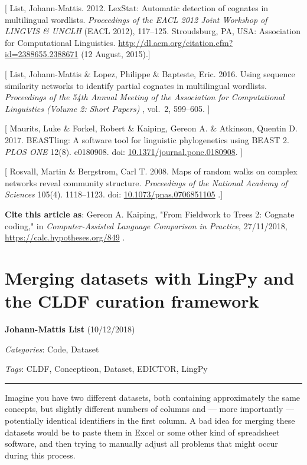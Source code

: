 \documentclass[
  english,
  a4paper,
  oneside,tablecaptionabove
]{scrbook}
\begin{document}
{[} List, Johann-Mattis. 2012. LexStat: Automatic detection of cognates
in multilingual wordlists. \emph{Proceedings of the EACL 2012 Joint
Workshop of LINGVIS \& UNCLH} (EACL 2012), 117--125. Stroudsburg, PA,
USA: Association for Computational Linguistics.
\url{http://dl.acm.org/citation.cfm?id=2388655.2388671} (12 August,
2015).{]}

{[} List, Johann-Mattis \& Lopez, Philippe \& Bapteste, Eric. 2016.
Using sequence similarity networks to identify partial cognates in
multilingual wordlists. \emph{Proceedings of the 54th Annual Meeting of
the Association for Computational Linguistics (Volume 2: Short Papers)}
, vol.~2, 599--605. {]}

{[} Maurits, Luke \& Forkel, Robert \& Kaiping, Gereon A. \& Atkinson,
Quentin D. 2017. BEASTling: A software tool for linguistic phylogenetics
using BEAST 2. \emph{PLOS ONE} 12(8). e0180908. doi:
\href{https://doi.org/10.1371/journal.pone.0180908}{10.1371/journal.pone.0180908}.
{]}

{[} Rosvall, Martin \& Bergstrom, Carl T. 2008. Maps of random walks on
complex networks reveal community structure. \emph{Proceedings of the
National Academy of Sciences} 105(4). 1118--1123. doi:
\href{https://doi.org/10.1073/pnas.0706851105}{10.1073/pnas.0706851105}
.{]}

\textbf{Cite this article as}: Gereon A. Kaiping, "From Fieldwork to
Trees 2: Cognate coding," in \emph{Computer-Assisted Language Comparison
in Practice}, 27/11/2018, \url{https://calc.hypotheses.org/849} .

\hypertarget{merging-datasets-with-lingpy-and-the-cldf-curation-framework}{%
\chapter{Merging datasets with LingPy and the CLDF curation
framework}\label{merging-datasets-with-lingpy-and-the-cldf-curation-framework}}

\textbf{Johann-Mattis List} (10/12/2018)

\emph{Categories}: Code, Dataset

\emph{Tags}: CLDF, Concepticon, Dataset, EDICTOR, LingPy

\begin{center}\rule{0.5\linewidth}{\linethickness}\end{center}

\leavevmode\hypertarget{markdown}{}%
Imagine you have two different datasets, both containing approximately
the same concepts, but slightly different numbers of columns and ---
more importantly --- potentially identical identifiers in the first
column. A bad idea for merging these datasets would be to paste them in
Excel or some other kind of spreadsheet software, and then trying to
manually adjust all problems that might occur during this process.
\end{document}

